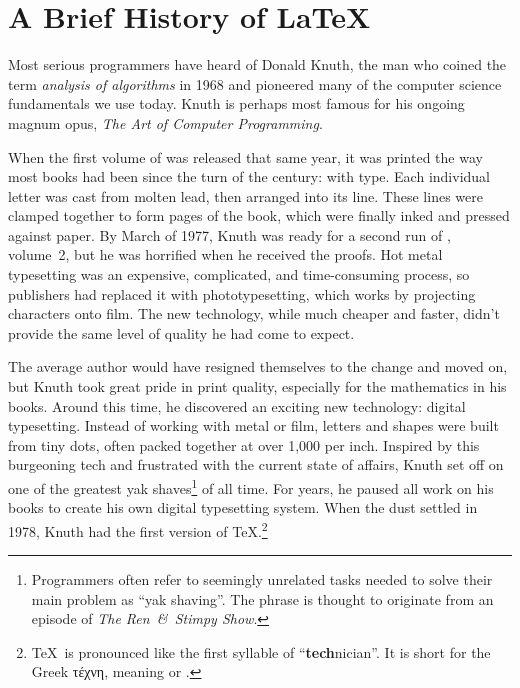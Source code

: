 \chapter{A Brief History of \texorpdfstring{\LaTeX}{LaTeX}}
\label{history}

Most serious programmers have heard of Donald Knuth,
the man who coined the term \emph{analysis of algorithms} in 1968
and pioneered many of the computer science fundamentals we use today.
Knuth is perhaps most famous for his ongoing magnum opus,
\textit{The Art of Computer Programming}.

When the first volume of  was released that same year,
it was printed the way most books had been since the turn of the century:
with  type.
Each individual letter was cast from molten lead,
then arranged into its line.
These lines were clamped together to form pages of the book,
which were finally inked and pressed against paper.
By March of 1977, Knuth was ready for a second run of , volume~2,
but he was horrified when he received the proofs.
Hot metal typesetting was an expensive, complicated, and time-consuming process,
so publishers had replaced it with phototypesetting,
which works by projecting characters onto film.
The new technology, while much cheaper and faster,
didn't provide the same level of quality he had come to
expect.\punckern{}

The average author would have resigned themselves to the change and moved on,
but Knuth took great pride in print quality,
especially for the mathematics in his books.
Around this time, he discovered an exciting new technology:
digital typesetting.
Instead of working with metal or film,
letters and shapes were built from tiny dots,
often packed together at over 1,000 per inch.
Inspired by this burgeoning tech and frustrated with the current state of affairs,
Knuth set off on one of the greatest yak shaves\footnote{Programmers
often refer to seemingly unrelated tasks needed to solve their main problem
as ``yak shaving''\quotekern. The phrase is thought to originate from an episode
of \textit{The Ren~\&~Stimpy Show}.}
of all time.
For years, he paused all work on his books to create his own
digital typesetting system.
When the dust settled in 1978, Knuth had the first version of
\TeX.\punckern\footnote{\TeX\ is pronounced like the first syllable of
``\textbf{tech}nician''\quotekern. It is short for the Greek
{τέχνη},
meaning  or .}

